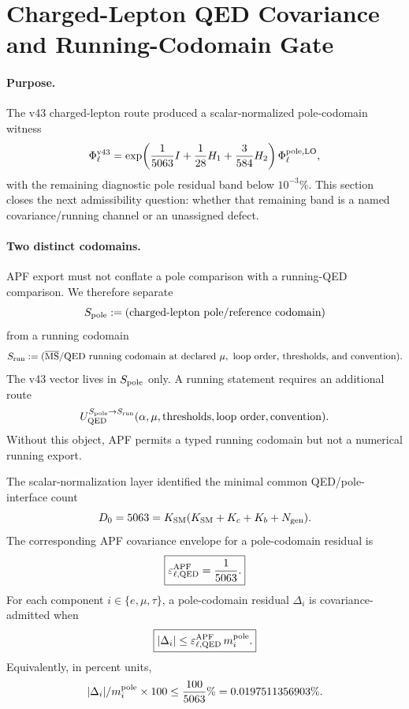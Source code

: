 
\section{Charged-Lepton QED Covariance and Running-Codomain Gate}\label{sec:v44_qed_covariance_running_codomain}

\paragraph{Purpose.}
The v43 charged-lepton route produced a scalar-normalized pole-codomain witness
\[
\Phi_\ell^{\rm v43}
=\exp\!\left({1\over5063}I+{1\over28}H_1+{3\over584}H_2\right)
\Phi_\ell^{\rm pole,LO},
\]
with the remaining diagnostic pole residual band below $10^{-3}\%$.  This section closes the next admissibility question: whether that remaining band is a named covariance/running channel or an unassigned defect.

\paragraph{Two distinct codomains.}
APF export must not conflate a pole comparison with a running-QED comparison.  We therefore separate
\[
S_{\rm pole}:=(\hbox{charged-lepton pole/reference codomain})
\]
from a running codomain
\[
S_{\rm run}:=(\overline{\rm MS}/\hbox{QED running codomain at declared }\mu,\hbox{ loop order, thresholds, and convention}).
\]
The v43 vector lives in $S_{\rm pole}$ only.  A running statement requires an additional route
\[
U_{\rm QED}^{S_{\rm pole}\to S_{\rm run}}(\alpha,\mu,\hbox{thresholds},\hbox{loop order},\hbox{convention}).
\]
Without this object, APF permits a typed running codomain but not a numerical running export.

\begin{definition}\label{def:v44_qed_cov_envelope}
The scalar-normalization layer identified the minimal common QED/pole-interface count
\[
D_0=5063=K_{\rm SM}(K_{\rm SM}+K_c+K_b+N_{\rm gen}).
\]
The corresponding APF covariance envelope for a pole-codomain residual is
\[
\boxed{\varepsilon_{\ell,{\rm QED}}^{\rm APF}={1\over5063}.}
\]
For each component $i\in\{e,\mu,\tau\}$, a pole-codomain residual $\Delta_i$ is covariance-admitted when
\[
\boxed{|\Delta_i|\le \varepsilon_{\ell,{\rm QED}}^{\rm APF}\,m_i^{\rm pole}.}
\]
Equivalently, in percent units,
\[
|\Delta_i|/m_i^{\rm pole}\times100 \le {100\over5063}\%=0.0197511356903\%.
\]
\end{definition}


